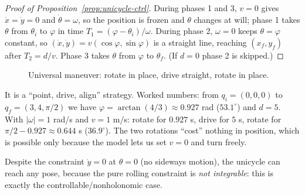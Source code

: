 \documentclass[11pt,a4paper]{article}
\theoremstyle{definition}
\begin{document}
\begin{proof}[Proof of Proposition~\ref{prop:unicycle-ctrl}]
During phases 1 and 3, $v=0$ gives $\dot x=\dot y=0$ and $\dot\theta=\omega$, so the position is frozen and $\theta$ changes at will; phase 1 takes $\theta$ from $\theta_i$ to $\varphi$ in time $T_1=(\varphi-\theta_i)/\omega$. During phase 2, $\omega=0$ keeps $\theta=\varphi$ constant, so $(\dot x,\dot y)=v(\cos\varphi,\sin\varphi)$ is a straight line, reaching $(x_f,y_f)$ after $T_2=d/v$. Phase 3 takes $\theta$ from $\varphi$ to $\theta_f$. (If $d=0$ phase 2 is skipped.)
\end{proof}

\begin{figure}[h]
\centering
{}
\caption{Universal maneuver: rotate in place, drive straight, rotate in place.}
\end{figure}

\begin{intuition}
It is a ``point, drive, align'' strategy. Worked numbers: from $q_i=(0,0,0)$ to $q_f=(3,4,\pi/2)$ we have $\varphi=\arctan(4/3)\approx0.927$ rad ($53.1^\circ$) and $d=5$. With $|\omega|=1$ rad/s and $v=1$ m/s: rotate for $0.927$ s, drive for $5$ s, rotate for $\pi/2-0.927\approx0.644$ s ($36.9^\circ$). The two rotations ``cost'' nothing in position, which is possible only because the model lets us set $v=0$ and turn freely.
\end{intuition}

\begin{intuition}
Despite the constraint $\dot y=0$ at $\theta=0$ (no sideways motion), the unicycle can reach any pose, because the pure rolling constraint is \emph{not integrable}: this is exactly the controllable/nonholonomic case.
\end{intuition}
\end{document}
